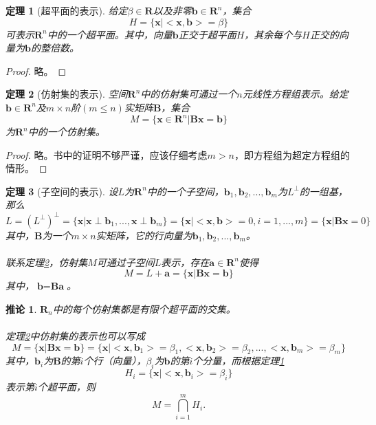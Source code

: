 \documentclass[a4paper,11pt,oneside]{article}
\newtheorem{theorem}{定理}[section]
\newtheorem{proof}{证明}[section]
\newtheorem{inference}{推论}[section]
\begin{document}
			\begin{theorem}[超平面的表示]
				\label{the:3}
				给定$\beta \in \textbf{R}$以及非零$\textbf{b} \in \textbf{R}^{n}$，集合
				$$H=\{\textbf{x}|<\textbf{x},\textbf{b}>=\beta\}$$
				可表示$\textbf{R}^{n}$中的一个超平面。其中，向量$\textbf{b}$正交于超平面$H$，其余每个与$H$正交的向量为$\textbf{b}$的整倍数。
			\end{theorem}
			\begin{proof}
				略。
			\end{proof}
			\begin{theorem}[仿射集的表示]
				\label{the:4}
				空间$\textbf{R}^{n}$中的仿射集可通过一个$n$元线性方程组表示。给定$\textbf{b}\in \textbf{R}^{n}$及$m\times n$阶$(m \leq n)$实矩阵$\textbf{B}$，集合
				$$M=\{\textbf{x}\in \textbf{R}^{n}|\textbf{B}\textbf{x}=\textbf{b}\}$$
				为$\textbf{R}^{n}$中的一个仿射集。
			\end{theorem}
			\begin{proof}
				略。书中的证明不够严谨，应该仔细考虑$m>n$，即方程组为超定方程组的情形。
			\end{proof}
			\begin{theorem}[子空间的表示]
				设$L$为$\textbf{R}^{n}$中的一个子空间，$\textbf{b}_{1},\textbf{b}_{2},...,\textbf{b}_{m}$为$L^{\perp}$的一组基，那么
				$$L=(L^{\perp})^{\perp}=\{\textbf{x}|\textbf{x}\perp\textbf{b}_{1},...,\textbf{x}\perp\textbf{b}_{m}\}=\{\textbf{x}|<\textbf{x},\textbf{b}>=0,i=1,...,m\}=\{\textbf{x}|\textbf{B}\textbf{x}=0\}$$
				其中，$\textbf{B}$为一个$m\times n$实矩阵，它的行向量为$\textbf{b}_{1},\textbf{b}_{2},...,\textbf{b}_{m}$。\\
				\\
				联系定理\ref{the:4}，仿射集$M$可通过子空间$L$表示，存在$\textbf{a}\in \textbf{R}^{n}$使得
				$$M=L+\textbf{a}=\{\textbf{x}|\textbf{B}\textbf{x}=\textbf{b}\}$$
				其中，$\textbf{b}=\textbf{B}\textbf{a}$。
			\end{theorem}
			\begin{inference}
				$\textbf{R}_{n}$中的每个仿射集都是有限个超平面的交集。\\
				\\
				定理\ref{the:4}中仿射集的表示也可以写成
				$$M=\{\textbf{x}|\textbf{B}\textbf{x}=\textbf{b}\}=\{\textbf{x}|<\textbf{x},\textbf{b}_{1}>=\beta_{1},<\textbf{x},\textbf{b}_{2}>=\beta_{2},...,<\textbf{x},\textbf{b}_{m}>=\beta_{m}\}$$
				其中，$\textbf{b}_{i}$为$\textbf{B}$的第$i$个行（向量），$\beta_{i}$为$\textbf{b}$的第$i$个分量，而根据定理\ref{the:3}
				$$H_{i}=\{\textbf{x}|<\textbf{x},\textbf{b}_{i}>=\beta_{i}\}$$
				表示第$i$个超平面，则
				$$M=\bigcap_{i=1}^{m}H_{i}.$$
			\end{inference}
\end{document}

